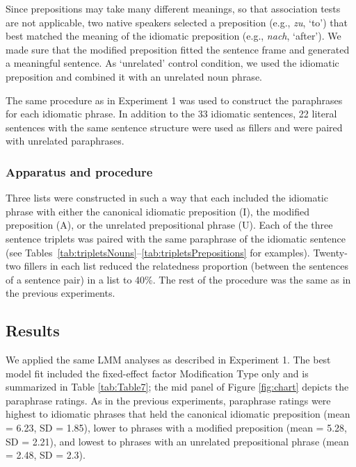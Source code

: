 \documentclass[output=paper]{langsci/langscibook}
\begin{document}
Since prepositions may take many different meanings, so that association tests are not applicable, two native speakers selected a preposition (e.g., \textit{zu}, ‘to’) that best matched the meaning of the idiomatic preposition (e.g., \textit{nach}, ‘after’). We made sure that the modified preposition fitted the sentence frame and generated a meaningful sentence. As ‘unrelated’ control condition, we used the idiomatic preposition and combined it with an unrelated noun phrase. 

The same procedure as in Experiment 1 was used to construct the paraphrases for each idiomatic phrase. In addition to the 33 idiomatic sentences, 22 literal sentences with the same sentence structure were used as fillers and were paired with unrelated paraphrases.

\subsubsection{Apparatus and procedure}

Three lists were constructed in such a way that each included the idiomatic phrase with either the canonical idiomatic preposition (I), the modified preposition (A), or the unrelated prepositional phrase (U). Each of the three sentence triplets was paired with the same paraphrase of the idiomatic sentence (see Tables~\ref{tab:tripletsNouns}--\ref{tab:tripletsPrepositions} for examples). Twenty-two fillers in each list reduced the relatedness proportion (between the sentences of a sentence pair) in a list to 40\%. The rest of the procedure was the same as in the previous experiments. 

\subsection{Results}

We applied the same LMM analyses as described in Experiment 1. The best model fit included the fixed-effect factor Modification Type only and is summarized in Table \ref{tab:Table7}; the mid panel of Figure \ref{fig:chart} depicts the paraphrase ratings. As in the previous experiments, paraphrase ratings were highest to idiomatic phrases that held the canonical idiomatic preposition (mean = 6.23, SD = 1.85), lower to phrases with a modified preposition (mean = 5.28, SD = 2.21), and lowest to phrases with an unrelated prepositional phrase (mean = 2.48, SD = 2.3).
\end{document}
